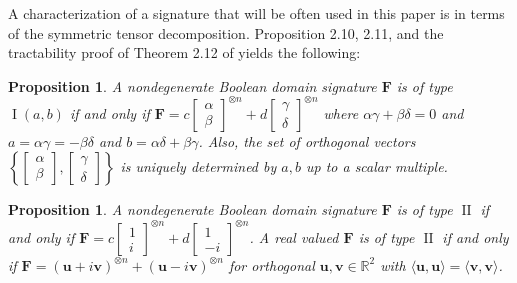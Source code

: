 \documentclass[11pt]{article}
\newtheorem{proposition}[theorem]{Proposition}
\DeclareMathOperator{\typei}{I}
\DeclareMathOperator{\typeii}{II}
\begin{document}
A characterization of a signature that will be often used in this paper is in terms of the symmetric tensor decomposition.
Proposition 2.10, 2.11, and the tractability proof of Theorem 2.12 of \cite{cai_complexity_2017} yields the following:
\begin{proposition}\label{prop:boolean-type-i-tensor-decomposition}
  A nondegenerate Boolean domain signature $\mathbf{F}$ is of type $\typei(a, b)$ if and only if $\mathbf{F} = c \begin{bmatrix}
  \alpha \\ \beta
  \end{bmatrix}^{\otimes n} + d \begin{bmatrix}
  \gamma \\ \delta
  \end{bmatrix}^{\otimes n}$ where $\alpha \gamma + \beta \delta = 0$ and $a = \alpha \gamma = - \beta \delta$ and $b = \alpha \delta + \beta \gamma$.
  Also, the set of orthogonal vectors $\left\{ \begin{bmatrix}
  \alpha \\ \beta
  \end{bmatrix}, \begin{bmatrix}
  \gamma \\ \delta
  \end{bmatrix} \right\}$ is uniquely determined by $a, b$ up to a scalar multiple.
\end{proposition}
\begin{proposition}\label{prop-boolean-type-ii-tensor-decomposition}
  A nondegenerate Boolean domain signature $\mathbf{F}$ is of type $\typeii$ if and only if 
  $\mathbf{F} = c \begin{bmatrix}
  1 \\ i
  \end{bmatrix}^{\otimes n} + d \begin{bmatrix}
  1 \\ -i
  \end{bmatrix}^{\otimes n}$.
  A real valued $\mathbf{F}$ is of type $\typeii$ if and only if $\mathbf{F} = (\mathbf{u} + i \mathbf{v})^{\otimes n} + (\mathbf{u} - i \mathbf{v})^{\otimes n}$ for orthogonal $\mathbf{u}, \mathbf{v} \in \mathbb{R}^2$ with $\langle \mathbf{u}, \mathbf{u} \rangle = \langle \mathbf{v}, \mathbf{v} \rangle$.
\end{proposition}
\end{document}
